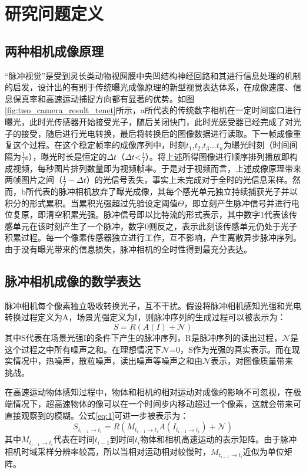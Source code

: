 \section{研究问题定义}
\subsection{两种相机成像原理}
“脉冲视觉”是受到灵长类动物视网膜中央凹结构神经回路和其进行信息处理的机制的启发，设计出的有别于传统曝光成像原理的新型视觉表达体系，在成像速度、信息保真率和高速运动捕捉方向都有显著的优势。如图\ref{fig:two_camera_result_tenet}所示，a所代表的传统数字相机在一定时间窗口进行曝光，此时光传感器开始接受光子，随后关闭快门，此时光感受器已经完成了对光子的接受，随后进行光电转换，最后将转换后的图像数据进行读取。下一帧成像重复这个过程。在这个稳定帧率的成像序列中，时刻$t_1$,$t_2$,$t_3$...$t_n$为曝光时刻（时间间隔为$\frac{1}{f}$s），曝光时长是恒定的$\Delta t$（$\Delta t$<$\frac{1}{f}$）。将上述所得图像进行顺序排列播放即构成视频，每秒图片排列数量即为视频帧率。于是对于视频而言，上述成像原理带来两帧图片之间（$\frac{1}{f}-\Delta t$）的光信号丢失，事实上未完成对于全时的光信息采样。然而，b所代表的脉冲相机放弃了曝光成像，其每个感光单元独立持续捕获光子并以积分的形式累积。当累积光强超过先验设定阈值$\Theta$，即立刻产生脉冲信号并进行电位复原，即清空积累光强。脉冲信号即以比特流的形式表示，其中数字1代表该传感单元在该时刻产生了一个脉冲，数字0则反之，表示此刻该传感单元仍处于光子积累过程。每一个像素传感器独立进行工作，互不影响，产生离散异步脉冲序列。由于没有曝光带来的信息损失，脉冲相机的全时性得到最充分表达。
\subsection{脉冲相机成像的数学表达}
脉冲相机每个像素独立吸收转换光子，互不干扰。假设将脉冲相机感知光强和光电转换过程定义为A，场景光强定义为I，则脉冲序列的生成过程可以被表示为：
\begin{equation}
  \label{eq:1}
    S=R(A(I)+\mathcal{N})
\end{equation}
其中S代表在场景光强I的条件下产生的脉冲序列，R是脉冲序列的读出过程，$\mathcal{N}$是这个过程之中所有噪声之和。在理想情况下$\mathcal{N}$=0，S作为光强的真实表示。而在现实情况中，热噪声，散粒噪声，读出噪声等噪声之和由$\mathcal{N}$表示，对图像质量带来挑战。

在高速运动物体感知过程中，物体和相机的相对运动对成像的影响不可忽视，在极端情况下，超高速物体的像可以在一个时间步内移动超过一个像素，这就会带来可直接观察到的模糊。公式\ref{eq:1}可进一步被表示为：
\begin{equation}
  \label{eq:2}
    S_{t_{i-1} \rightarrow t_{i}}=R(M_{t_{i-1} \rightarrow t_{i}}A(I_{t_{i-1} \rightarrow t_{i}})+\mathcal{N})
\end{equation}
其中$M_{t_{i-1} \rightarrow t_{i}}$代表在时间$t_{i-1}$到时间$t_{i}$物体和相机高速运动的表示矩阵。由于脉冲相机时域采样分辨率较高，所以当相对运动相对较慢时，$M_{t_{i-1} \rightarrow t_{i}}$近似为单位矩阵。

